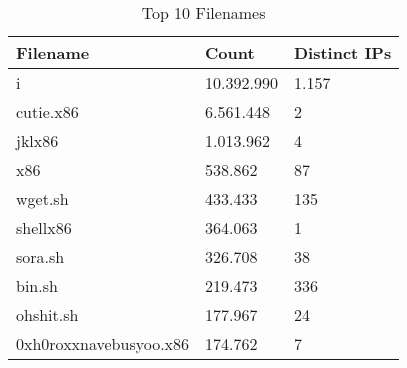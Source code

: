 \begin{table}
\caption{Top 10 Filenames}
\label{tab:top10_filenames}
\begin{tabular}{lll}
\toprule
Filename & Count & Distinct IPs \\
\midrule
i & 10.392.990 & 1.157 \\
cutie.x86 & 6.561.448 & 2 \\
jklx86 & 1.013.962 & 4 \\
x86 & 538.862 & 87 \\
wget.sh & 433.433 & 135 \\
shellx86 & 364.063 & 1 \\
sora.sh & 326.708 & 38 \\
bin.sh & 219.473 & 336 \\
ohshit.sh & 177.967 & 24 \\
0xh0roxxnavebusyoo.x86 & 174.762 & 7 \\
\bottomrule
\end{tabular}
\end{table}
